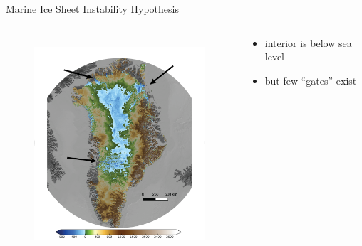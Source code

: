 \documentclass[hide notes,intlimits]{beamer}
\begin{document}
\begin{frame}{Marine Ice Sheet Instability Hypothesis}
  \begin{columns}[c]
    \begin{column}{.60\linewidth}
      \begin{figure}
        \includegraphics[height=8cm]{gris-marine}
      \end{figure}
    \end{column}
    \begin{column}{.40\linewidth}
      \begin{itemize}
        \item interior is below sea level
        \item but few ``gates'' exist
      \end{itemize}
    \end{column}
  \end{columns}
\end{frame}
\end{document}

